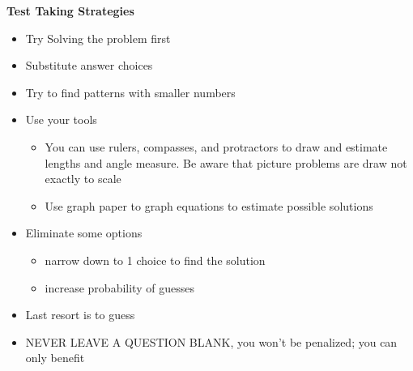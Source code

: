 \documentclass[11pt,letterpaper]{article}
\begin{document}
\centering
\begin{minipage}{\textwidth}
     \noindent \textbf{Test Taking Strategies}
     \begin{itemize}
          \item Try Solving the problem first
          \item Substitute answer choices
          \item Try to find patterns with smaller numbers
          \item Use your tools
           \begin{itemize}
               \item You can use rulers, compasses, and protractors to draw and estimate lengths and angle measure. Be aware that picture problems are draw not exactly to scale
               \item Use graph paper to graph equations to estimate possible solutions
          \end{itemize}
          \item Eliminate some options 
          \begin{itemize}
               \item narrow down to 1 choice to find the solution
               \item increase probability of guesses
          \end{itemize}
          \item Last resort is to guess
          \item NEVER LEAVE A QUESTION BLANK, you won't be penalized; you can only benefit
          
     \end{itemize}

\end{minipage}


\vspace{0.4cm}
\end{document}
